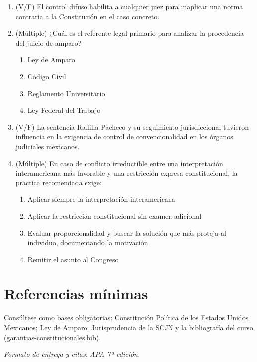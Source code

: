 \documentclass[12pt]{article}
\begin{document}
\begin{enumerate}
\begin{enumerate}[label=\Alph*.]
      \item Ignorar la jurisprudencia interamericana si México no fue parte
      \item Sustituir la Constitución por la interpretación interamericana
    \end{enumerate}
  \item (V/F) El control difuso habilita a cualquier juez para inaplicar una norma contraria a la Constitución en el caso concreto.
  \item (Múltiple) ¿Cuál es el referente legal primario para analizar la procedencia del juicio de amparo?
    \begin{enumerate}[label=\Alph*.]
      \item Ley de Amparo
      \item Código Civil
      \item Reglamento Universitario
      \item Ley Federal del Trabajo
    \end{enumerate}
  \item (V/F) La sentencia Radilla Pacheco y su seguimiento jurisdiccional tuvieron influencia en la exigencia de control de convencionalidad en los órganos judiciales mexicanos.
  \item (Múltiple) En caso de conflicto irreductible entre una interpretación interamericana más favorable y una restricción expresa constitucional, la práctica recomendada exige:
    \begin{enumerate}[label=\Alph*.]
      \item Aplicar siempre la interpretación interamericana
      \item Aplicar la restricción constitucional sin examen adicional
      \item Evaluar proporcionalidad y buscar la solución que más proteja al individuo, documentando la motivación
      \item Remitir el asunto al Congreso
    \end{enumerate}
\end{enumerate}

\section*{Referencias mínimas}
Consúltese como bases obligatorias: Constitución Política de los Estados Unidos Mexicanos; Ley de Amparo; Jurisprudencia de la SCJN y la bibliografía del curso (garantias-constitucionales.bib).

\vfill
\noindent\textit{Formato de entrega y citas: APA 7ª edición.}
\end{document}
